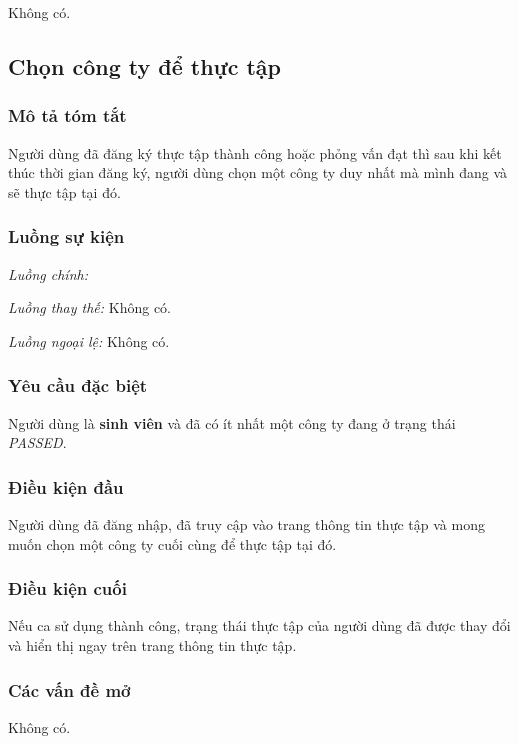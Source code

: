 \documentclass[./../main.tex]{subfiles}
\begin{document}
Không có.

\subsection{Chọn công ty để thực tập}

\subsubsection*{Mô tả tóm tắt}

Người dùng đã đăng ký thực tập thành công hoặc phỏng vấn đạt thì sau khi
kết thúc thời gian đăng ký, người dùng chọn một công ty duy nhất mà mình
đang và sẽ thực tập tại đó.

\subsubsection*{Luồng sự kiện}

\emph{Luồng chính:}

\emph{Luồng thay thế:} Không có.

\emph{Luồng ngoại lệ:} Không có.

\subsubsection*{Yêu cầu đặc biệt}

Người dùng là \textbf{sinh viên} và đã có ít nhất một công ty đang ở
trạng thái \emph{PASSED}.

\subsubsection*{Điều kiện đầu}

Người dùng đã đăng nhập, đã truy cập vào trang thông tin thực tập và
mong muốn chọn một công ty cuối cùng để thực tập tại đó.

\subsubsection*{Điều kiện cuối}

Nếu ca sử dụng thành công, trạng thái thực tập của người dùng đã được
thay đổi và hiển thị ngay trên trang thông tin thực tập.

\subsubsection*{Các vấn đề mở}

Không có.
\end{document}
